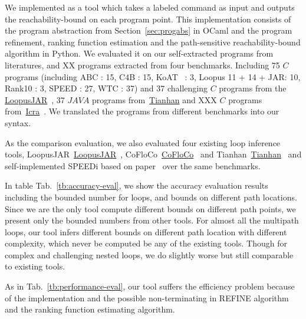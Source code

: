We implemented {\THESYSTEM} as a tool which takes a labeled command as input  
and outputs the reachability-bound on each program point.
This implementation consists of the 
program abstraction from Section~\ref{sec:progabs} in OCaml and the program refinement, ranking function estimation and the path-sensitive reachability-bound algorithm in Python.
We evaluated it on our self-extracted programs from literatures, and XX programs extracted from four benchmarks. 
Including 75 $C$ programs (including ABC : 15, C4B : 15, KoAT~\cite{BrockschmidtEFFG14,FalkeKS12,FalkeKS11} : 3, Loopus 11 + 14 + JAR: 10, Rank10 : 3, SPEED : 27, WTC : 37) and 37 challenging $C$ programs 
from the \hyperlink{https://forsyte.at/static/people/sinn/loopusJAR/index.html}{LoopusJAR}~\cite{SinnZV17},
37 $JAVA$ programs from~\hyperlink{https://zenodo.org/record/5140586\#.Y5pBoC-B1QI}{Tianhan}\cite{LuCT21}
and XXX $C$ programs from~\hyperlink{https://github.com/icra-team/icra}{Icra}~\cite{KincaidBCR19,CyphertBKR19}.
We translated the programs from different benchmarks into our syntax.

As the comparison evaluation, we also evaluated four existing loop inference tools, 
LoopusJAR~\hyperlink{https://forsyte.at/software/loopus/}{LoopusJAR}~\cite{SinnZV17},
CoFloCo~\hyperlink{https://github.com/aeflores/CoFloCo/tree/master/src}{CoFloCo}~\cite{Montoya17,Flores-Montoya16,Flores-MontoyaH14}
and Tianhan~\hyperlink{https://zenodo.org/record/5140586\#.Y5pBoC-B1QI}{Tianhan}~\cite{LuCT21}
and self-implemented SPEEDi based on paper~\cite{GulwaniJK09}
over the same benchmarks.

In table Tab.~\ref{tb:accuracy-eval}, we show the accuracy evaluation results including the bounded number for loops, and bounds on different path locations.
Since we are the only tool compute different bounds on different path points, we present only the bounded numbers from other tools. For almost all the multipath loops, our tool infers different bounds on different path location with different complexity, which never be computed be any of the existing tools.
Though for complex and challenging nested loops, we do slightly worse but still comparable to existing tools.

As in Tab.~\ref{tb:performance-eval}, our tool suffers the efficiency problem because of the implementation and the possible non-terminating in REFINE algorithm and the ranking function estimating algorithm.


